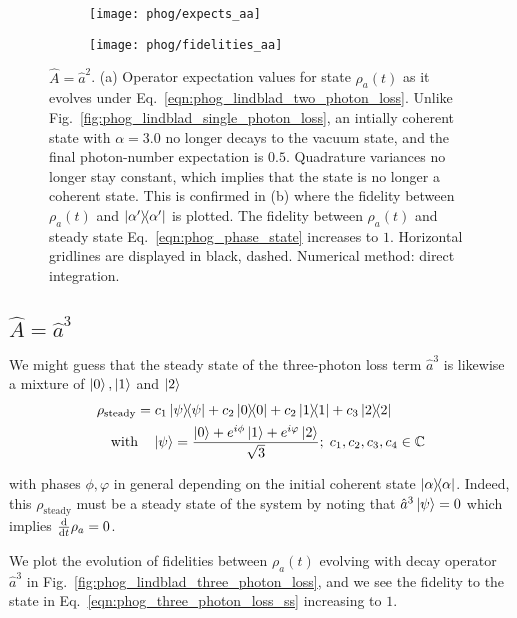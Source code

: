 \begin{figure}[htp]
\captionsetup{width=\linewidth}
\centering
	\begin{subfigure}{0.7\linewidth}
	\centering
	\caption{}
	\texttt{[image: phog/expects\_aa]}
	\end{subfigure}
	\begin{subfigure}{0.7\linewidth}
	\centering
	\caption{}
	\texttt{[image: phog/fidelities\_aa]}
	\end{subfigure}
\caption{\label{fig:phog_lindblad_two_photon_loss}$\hat{A} = \hat{a}^2$. (a) Operator expectation values for state $\rho_a\left(t\right)$ as it evolves under Eq.~\ref{eqn:phog_lindblad_two_photon_loss}. Unlike Fig.~\ref{fig:phog_lindblad_single_photon_loss}, an intially coherent state with $\alpha=3.0$ no longer decays to the vacuum state, and the final photon-number expectation is $0.5$. Quadrature variances no longer stay constant, which implies that the state is no longer a coherent state. This is confirmed in (b) where the fidelity between $\rho_a\left(t\right)$ and $\dyad{\alpha^\prime}$ is plotted. The fidelity between $\rho_a\left(t\right)$ and steady state Eq.~\ref{eqn:phog_phase_state} increases to $1$. Horizontal gridlines are displayed in black, dashed. Numerical method: direct integration.} 
\end{figure}

\iffalse
\clearpage
\subsection{$\hat{A} = \hat{a}^3$}\label{sec:A_aaa}
We might guess that the steady state of the three-photon loss term $\hat{a}^3$ is likewise a mixture of $\ket{0}, \ket{1}$ and $\ket{2}$
\begin{align}\label{eqn:phog_three_photon_loss_ss}
&\rho_{\text{steady}} = c_1 \dyad{\psi} + c_2 \dyad{0} + c_2 \dyad{1} + c_3 \dyad{2} \notag \\
%
&\qq{with} \ket{\psi} = \frac{\ket{0} + e^{i \phi}\ket{1} + e^{i \varphi}\ket{2}}{\sqrt{3}}; \; c_1, c_2, c_3, c_4 \in \mathbb{C}
\end{align}

\noindent with phases $\phi, \varphi$ in general depending on the initial coherent state $\dyad{\alpha}$. 
Indeed, this $\rho_{\text{steady}}$ must be a steady state of the system by noting that $\hat{a}^3 \ket{\psi} = 0$ which implies $\frac{\mathrm{d}}{\mathrm{d}t} \rho_a = 0$.

We plot the evolution of fidelities between $\rho_a\left(t\right)$ evolving with decay operator $\hat{a}^3$ in Fig.~\ref{fig:phog_lindblad_three_photon_loss}, and we see the fidelity to the state in Eq.~\ref{eqn:phog_three_photon_loss_ss} increasing to $1$. 

